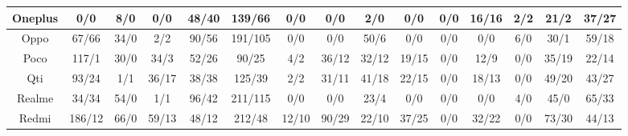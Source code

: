 \begin{table*}[t]
\begin{threeparttable}
{\begin{tabular}{|c|ccccccc|ccccccc|}
Oneplus                & \multicolumn{1}{c|}{0/0}      & \multicolumn{1}{c|}{8/0}    & \multicolumn{1}{c|}{0/0}     & \multicolumn{1}{c|}{48/40}    & \multicolumn{1}{c|}{139/66}    & \multicolumn{1}{c|}{0/0}      & 0/0     & \multicolumn{1}{c|}{2/0}      & \multicolumn{1}{c|}{0/0}     & \multicolumn{1}{c|}{0/0}  & \multicolumn{1}{c|}{16/16}   & \multicolumn{1}{c|}{2/2}  & \multicolumn{1}{c|}{21/2}     & 37/27    \\ \hline
Oppo                   & \multicolumn{1}{c|}{67/66}    & \multicolumn{1}{c|}{34/0}   & \multicolumn{1}{c|}{2/2}     & \multicolumn{1}{c|}{90/56}    & \multicolumn{1}{c|}{191/105}   & \multicolumn{1}{c|}{0/0}      & 0/0     & \multicolumn{1}{c|}{50/6}     & \multicolumn{1}{c|}{0/0}     & \multicolumn{1}{c|}{0/0}  & \multicolumn{1}{c|}{0/0}     & \multicolumn{1}{c|}{6/0}  & \multicolumn{1}{c|}{30/1}     & 59/18    \\ \hline
Poco                   & \multicolumn{1}{c|}{117/1}    & \multicolumn{1}{c|}{30/0}   & \multicolumn{1}{c|}{34/3}    & \multicolumn{1}{c|}{52/26}    & \multicolumn{1}{c|}{90/25}     & \multicolumn{1}{c|}{4/2}      & 36/12   & \multicolumn{1}{c|}{32/12}    & \multicolumn{1}{c|}{19/15}   & \multicolumn{1}{c|}{0/0}  & \multicolumn{1}{c|}{12/9}    & \multicolumn{1}{c|}{0/0}  & \multicolumn{1}{c|}{35/19}    & 22/14    \\ \hline
Qti                    & \multicolumn{1}{c|}{93/24}    & \multicolumn{1}{c|}{1/1}    & \multicolumn{1}{c|}{36/17}   & \multicolumn{1}{c|}{38/38}    & \multicolumn{1}{c|}{125/39}    & \multicolumn{1}{c|}{2/2}      & 31/11   & \multicolumn{1}{c|}{41/18}    & \multicolumn{1}{c|}{22/15}   & \multicolumn{1}{c|}{0/0}  & \multicolumn{1}{c|}{18/13}   & \multicolumn{1}{c|}{0/0}  & \multicolumn{1}{c|}{49/20}    & 43/27    \\ \hline
Realme                 & \multicolumn{1}{c|}{34/34}    & \multicolumn{1}{c|}{54/0}   & \multicolumn{1}{c|}{1/1}     & \multicolumn{1}{c|}{96/42}    & \multicolumn{1}{c|}{211/115}   & \multicolumn{1}{c|}{0/0}      & 0/0     & \multicolumn{1}{c|}{23/4}     & \multicolumn{1}{c|}{0/0}     & \multicolumn{1}{c|}{0/0}  & \multicolumn{1}{c|}{0/0}     & \multicolumn{1}{c|}{4/0}  & \multicolumn{1}{c|}{45/0}     & 65/33    \\ \hline
Redmi                  & \multicolumn{1}{c|}{186/12}   & \multicolumn{1}{c|}{66/0}   & \multicolumn{1}{c|}{59/13}   & \multicolumn{1}{c|}{48/12}    & \multicolumn{1}{c|}{212/48}    & \multicolumn{1}{c|}{12/10}    & 90/29   & \multicolumn{1}{c|}{22/10}    & \multicolumn{1}{c|}{37/25}   & \multicolumn{1}{c|}{0/0}  & \multicolumn{1}{c|}{32/22}   & \multicolumn{1}{c|}{0/0}  & \multicolumn{1}{c|}{73/30}    & 44/13    \\ \hline

\end{tabular}}
\end{threeparttable}
\end{table*}
